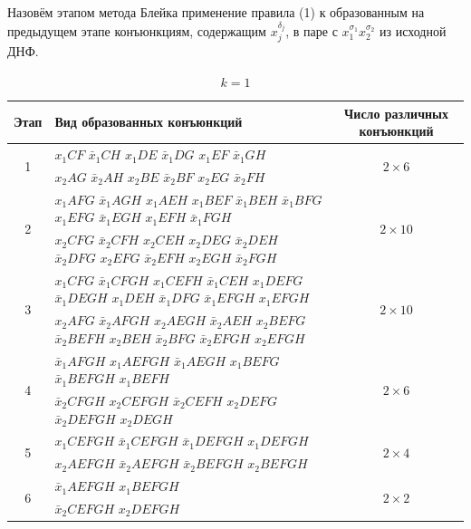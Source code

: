 \documentclass[12pt,a4paper,oneside,fleqn,leqno]{article}
\theoremstyle{definition}
\begin{document}
			Назовём этапом метода Блейка применение правила (1) к образованным на предыдущем этапе конъюнкциям, содержащим $x_j^{\delta_j}$, в паре с $x_1^{\sigma_1}x_2^{\sigma_2}$ из исходной ДНФ.
			\begin{table}[H]
				\centering
				\begin{tabular}{|c|p{4in}|c|}
					\hline
					Этап & Вид образованных конъюнкций & Число различных конъюнкций\\
					\hline
					\multirow{2}{*}{1} & $x_1CF$ $\bar{x}_1CH$ $x_1DE$ $\bar{x}_1DG$ $x_1EF$ $\bar{x}_1GH$ \vspace{5pt}& \multirow{2}{*}{$2 \times 6$}\\
					&$x_2AG$ $\bar{x}_2AH$ $x_2BE$ $\bar{x}_2BF$ $x_2EG$ $\bar{x}_2FH$&\\
					\hline
					\multirow{2}{*}{2} & $x_1AFG$ $\bar{x}_1AGH$ $x_1AEH$ $x_1BEF$ $\bar{x}_1BEH$ $\bar{x}_1BFG$ $x_1EFG$ $\bar{x}_1EGH$ $x_1EFH$ $\bar{x}_1FGH$ \vspace{5pt} & \multirow{2}{*}{$2 \times 10$}\\
					&$x_2CFG$ $\bar{x}_2CFH$ $x_2CEH$ $x_2DEG$ $\bar{x}_2DEH$ $\bar{x}_2DFG$ $x_2EFG$ $\bar{x}_2EFH$ $x_2EGH$ $\bar{x}_2FGH$&\\
					\hline
					\multirow{2}{*}{3} & $x_1CFG$ $\bar{x}_1CFGH$ $x_1CEFH$ $\bar{x}_1CEH$ $x_1DEFG$ $\bar{x}_1DEGH$ $x_1DEH$ $\bar{x}_1DFG$ $\bar{x}_1EFGH$ $x_1EFGH$\vspace{5pt} & \multirow{2}{*}{$2 \times 10$}\\
					&$x_2AFG$ $\bar{x}_2AFGH$ $x_2AEGH$ $\bar{x}_2AEH$ $x_2BEFG$ $\bar{x}_2BEFH$ $x_2BEH$ $\bar{x}_2BFG$ $\bar{x}_2EFGH$ $x_2EFGH$&\\
					\hline
					\multirow{2}{*}{4} & $\bar{x}_1AFGH$ $x_1AEFGH$ $\bar{x}_1AEGH$ $x_1BEFG$ $\bar{x}_1BEFGH$ $x_1BEFH$ \vspace{5pt} & \multirow{2}{*}{$2 \times 6$}\\
					&$\bar{x}_2CFGH$ $x_2CEFGH$ $\bar{x}_2CEFH$ $x_2DEFG$ $\bar{x}_2DEFGH$ $x_2DEGH$&\\
					\hline
					\multirow{2}{*}{5} & $x_1CEFGH$ $\bar{x}_1CEFGH$ $\bar{x}_1DEFGH$ $x_1DEFGH$ \vspace{5pt} & \multirow{2}{*}{$2 \times 4$}\\
					&$x_2AEFGH$ $\bar{x}_2AEFGH$ $\bar{x}_2BEFGH$ $x_2BEFGH$&\\
					\hline
					\multirow{2}{*}{6} & $\bar{x}_1AEFGH$ $x_1BEFGH$ \vspace{5pt} & \multirow{2}{*}{$2 \times 2$}\\
					&$\bar{x}_2CEFGH$ $x_2DEFGH$ &\\
					\hline
				\end{tabular}
				\caption{$k = 1$}
			\end{table}\par
\end{document}
